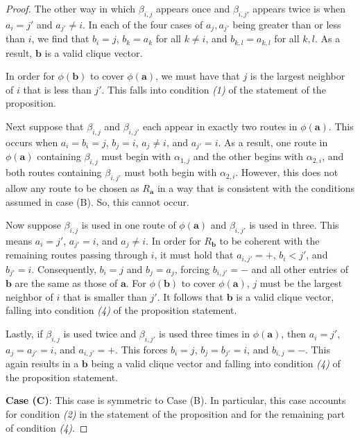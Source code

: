 \documentclass[12pt]{amsart}
\theoremstyle{definition}
\newcommand\ba{\mathbf{a}}
\newcommand\bb{\mathbf{b}}
\begin{document}
\begin{proof}
    The other way in which $\beta_{i,j}$ appears once and $\beta_{i,j'}$ appears twice is when $a_i = j'$ and $a_{j'} \neq i$.
    In each of the four cases of $a_j,a_{j'}$ being greater than or less than $i$, we find that $b_i = j$, $b_k = a_k$ for all $k \neq i$, and $b_{k,l} = a_{k,l}$ for all $k,l$.
    As a result, $\bb$ is a valid clique vector.

    In order for $\phi(\bb)$ to cover $\phi(\ba)$, we must have that $j$ is the largest neighbor of $i$ that is less than $j'$. 
    This falls into condition \emph{(1)} of the statement of the proposition.

    Next suppose that $\beta_{i,j}$ and $\beta_{i,j'}$ each appear in exactly two routes in $\phi(\ba)$. 
    This occurs when $a_i = b_i = j$, $b_j = i$, $a_j \neq i$, and $a_{j'} = i$.
    As a result, one route in $\phi(\ba)$ containing $\beta_{i,j}$ must begin with $\alpha_{1,j}$ and the other begins with $\alpha_{2,i}$, and both routes containing $\beta_{i,j'}$ must both begin with $\alpha_{2,i}$.
    However, this does not allow any route to be chosen as $R_\ba$ in a way that is consistent with the conditions assumed in case (B).
    So, this cannot occur.

    Now suppose $\beta_{i,j}$ is used in one route of $\phi(\ba)$ and $\beta_{i,j'}$ is used in three.
    This means $a_i = j'$, $a_{j'} = i$, and $a_j \neq i$.
    In order for $R_\bb$ to be coherent with the remaining routes passing through $i$, it must hold that $a_{i,j'} = +$, $b_i < j'$, and $b_{j'} = i$.
    Consequently, $b_i = j$ and $b_j = a_j$, forcing $b_{i,j'} = -$ and all other entries of $\bb$ are the same as those of $\ba$. 
    For $\phi(\bb)$ to cover $\phi(\ba)$, $j$ must be the largest neighbor of $i$ that is smaller than $j'$.
    It follows that $\bb$ is a valid clique vector, falling into condition \emph{(4)} of the proposition statement.

    Lastly, if $\beta_{i,j}$ is used twice and $\beta_{i,j'}$ is used three times in $\phi(\ba)$, then $a_i = j'$, $a_j = a_{j'} = i$, and $a_{i,j'} = +$.
    This forces $b_i = j$, $b_j = b_{j'} = i$, and $b_{i,j} = -$.
    This again results in a $\bb$ being a valid clique vector and falling into condition \emph{(4)} of the proposition statement. 

    \textbf{Case (C)}: This case is symmetric to Case (B).
    In particular, this case accounts for condition \emph{(2)} in the statement of the proposition and for the remaining part of condition \emph{(4)}.


\end{proof}
\end{document}
